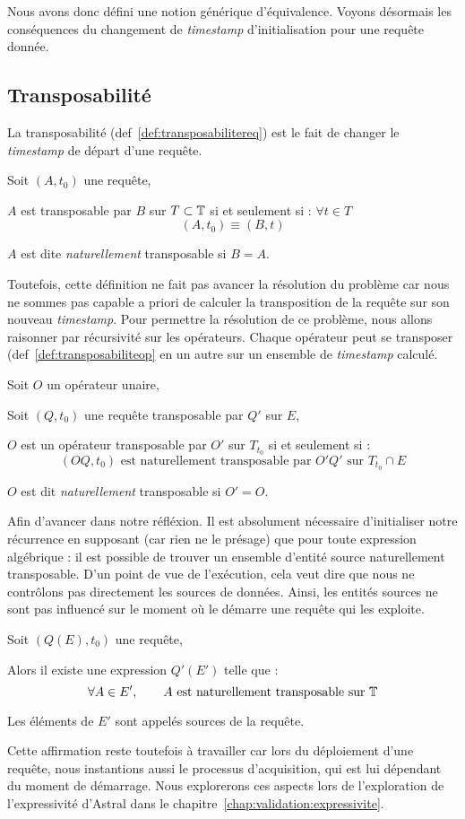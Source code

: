 Nous avons donc défini une notion générique d'équivalence. Voyons désormais les conséquences du changement de \textit{timestamp} d'initialisation pour une requête donnée.
\subsection{Transposabilité}
La transposabilité (def~\ref{def:transposabilitereq}) est le fait de changer le \textit{timestamp} de départ d'une requête.
\begin{defi}\label{def:transposabilitereq}
    Soit $(A,t_0)$ une requête,

    $A$ est transposable par $B$ sur $T\subset \mathbb{T}$ si et seulement si : $\forall t\in T$ $$(A,t_0) \equiv (B,t)$$

    $A$ est dite \textit{naturellement} transposable si $B=A$.
\end{defi}
Toutefois, cette définition ne fait pas avancer la résolution du problème car nous ne sommes pas capable a priori de calculer la transposition de la requête sur son nouveau \textit{timestamp}. Pour permettre la résolution de ce problème, nous allons raisonner par récursivité sur les opérateurs. Chaque opérateur peut se transposer (def~\ref{def:transposabiliteop} en un autre sur un ensemble de \textit{timestamp} calculé.
\begin{defi}\label{def:transposabiliteop}
    Soit $O$ un opérateur unaire,

    Soit $(Q,t_0)$ une requête transposable par $Q'$ sur $E$,

    $O$ est un opérateur transposable par $O'$ sur $T_{t_0}$ si et seulement si : $$(OQ,t_0) \textrm{ est naturellement transposable par } O'Q' \textrm{ sur } T_{t_0}\cap E$$

    $O$ est dit \textit{naturellement} transposable si $O'=O$.
\end{defi}

Afin d'avancer dans notre réfléxion. Il est absolument nécessaire d'initialiser notre récurrence en supposant (car rien ne le présage) que pour toute expression algébrique : il est possible de trouver un ensemble d'entité source naturellement transposable. D'un point de vue de l'exécution, cela veut dire que nous ne contrôlons pas directement les sources de données. Ainsi, les entités sources ne sont pas influencé sur le moment où le démarre une requête qui les exploite.
\begin{hyp}\label{hyp:transposabilite}
    Soit $(Q(E),t_0)$ une requête,

    Alors il existe une expression $Q'(E')$ telle que : $$\forall A\in E', \qquad A \textrm{ est naturellement transposable sur } \mathbb{T}$$
    
    Les éléments de $E'$ sont appelés sources de la requête.
\end{hyp}
Cette affirmation reste toutefois à travailler car lors du déploiement d'une requête, nous instantions aussi le processus d'acquisition, qui est lui dépendant du moment de démarrage. Nous explorerons ces aspects lors de l'exploration de l'expressivité d'Astral dans le chapitre~\ref{chap:validation:expressivite}.

